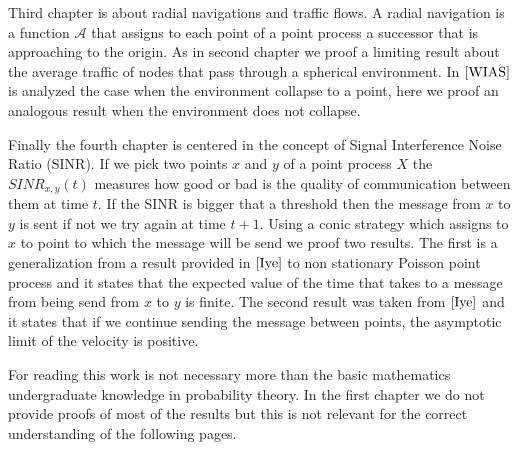 Third chapter is about radial navigations and traffic flows. A radial navigation is a function $\mathcal{A}$ that assigns to each point of a point process a successor that is approaching to the origin. As in second chapter we proof a limiting result about the average traffic of nodes that pass through a spherical environment. In $\cite{WIAS}$  is analyzed the case when the environment collapse to a point, here we proof an analogous result when the environment does not collapse.

Finally the fourth chapter is centered in the concept of Signal Interference Noise Ratio (SINR). If we pick two points $x$ and $y$ of a point process $X$ the $SINR_{x,y}(t)$ measures how good or bad is the quality of communication between them at time $t$. If the SINR is bigger that a threshold then the message from $x$ to $y$ is sent if not we try again at time $t+1$. Using a conic strategy which assigns to $x$ to point to which the message will be send we proof two results. The first is a generalization from a result provided in $\cite{Iye}$ to non stationary Poisson point process and it states that the expected value of the time that takes to a message from being send from $x$ to $y$ is finite. The second result was taken from $\cite{Iye}$ and it states that if we continue sending the message between points, the asymptotic limit of the velocity is positive.

For reading this work is not necessary more than the basic mathematics undergraduate knowledge in probability theory. In the first chapter we do not provide proofs of most of the results but this is not relevant for the correct understanding of the following pages.
